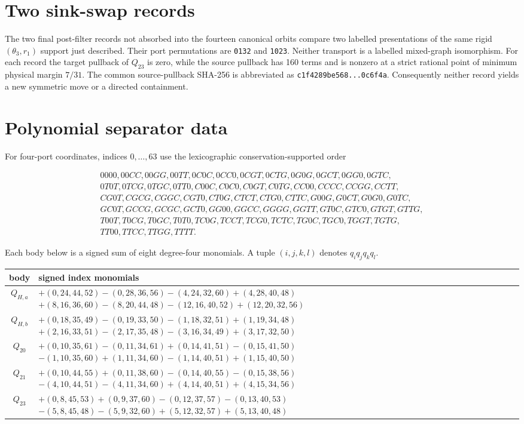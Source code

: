 \documentclass[10pt]{article}
\newcommand{\sha}[1]{\nolinkurl{#1}}
\begin{document}
\section{Two sink-swap records}

The two final post-filter records not absorbed into the fourteen canonical
orbits compare two labelled presentations of the same rigid
\((\theta_3,r_1)\) support just described.  Their port
permutations are \texttt{0132} and \texttt{1023}.  Neither transport is a
labelled mixed-graph isomorphism.  For each record the target pullback of
\(Q_{23}\) is zero, while the source pullback has 160 terms and is nonzero at
a strict rational point of minimum physical margin \(7/31\).  The common
source-pullback SHA-256 is abbreviated as
\sha{c1f4289be568...0c6f4a}.  Consequently neither
record yields a new symmetric move or a directed containment.

\section{Polynomial separator data}

For four-port coordinates, indices \(0,\ldots,63\) use the lexicographic
conservation-supported order

\begin{multline*}
0000,00CC,00GG,00TT,0C0C,0CC0,0CGT,0CTG,0G0G,0GCT,0GG0,0GTC,\\
0T0T,0TCG,0TGC,0TT0,C00C,C0C0,C0GT,C0TG,CC00,CCCC,CCGG,CCTT,\\
CG0T,CGCG,CGGC,CGT0,CT0G,CTCT,CTG0,CTTC,G00G,G0CT,G0G0,G0TC,\\
GC0T,GCCG,GCGC,GCT0,GG00,GGCC,GGGG,GGTT,GT0C,GTC0,GTGT,GTTG,\\
T00T,T0CG,T0GC,T0T0,TC0G,TCCT,TCG0,TCTC,TG0C,TGC0,TGGT,TGTG,\\
TT00,TTCC,TTGG,TTTT.
\end{multline*}

Each body below is a signed sum of eight degree-four monomials.  A tuple
\((i,j,k,l)\) denotes \(q_iq_jq_kq_l\).

\begin{longtable}{cL{.79\linewidth}}
\toprule
body & signed index monomials\\
\midrule
\endhead
\(Q_{H,a}\) &
\(+(0,24,44,52)-(0,28,36,56)-(4,24,32,60)+(4,28,40,48)\)
\(+(8,16,36,60)-(8,20,44,48)-(12,16,40,52)+(12,20,32,56)\)\\
\(Q_{H,b}\) &
\(+(0,18,35,49)-(0,19,33,50)-(1,18,32,51)+(1,19,34,48)\)
\(+(2,16,33,51)-(2,17,35,48)-(3,16,34,49)+(3,17,32,50)\)\\
\(Q_{20}\) &
\(+(0,10,35,61)-(0,11,34,61)+(0,14,41,51)-(0,15,41,50)\)
\(-(1,10,35,60)+(1,11,34,60)-(1,14,40,51)+(1,15,40,50)\)\\
\(Q_{21}\) &
\(+(0,10,44,55)+(0,11,38,60)-(0,14,40,55)-(0,15,38,56)\)
\(-(4,10,44,51)-(4,11,34,60)+(4,14,40,51)+(4,15,34,56)\)\\
\(Q_{23}\) &
\(+(0,8,45,53)+(0,9,37,60)-(0,12,37,57)-(0,13,40,53)\)
\(-(5,8,45,48)-(5,9,32,60)+(5,12,32,57)+(5,13,40,48)\)\\
\bottomrule
\end{longtable}
\end{document}
